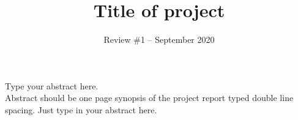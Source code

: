 \documentclass[BTech]{ugthesis}
\begin{document}

\title{Title of project } %

\fifthauthor{ }
\fifthauthorregno{}
\date{Review \#1 -- September 2020} %

\maketitle

\abstract
\begin{doublespacing}
{\large\noindent Type your abstract here.\\
 Abstract should be one page synopsis of the project report typed double line spacing. Just type in your abstract here.}
\end{doublespacing}

\pagebreak




\begin{singlespace}
\tableofcontents
\thispagestyle{empty}

\listoftables
{}
\listoffigures
{}
\end{singlespace}
\end{document}
